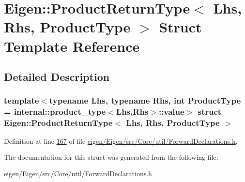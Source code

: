 \hypertarget{struct_eigen_1_1_product_return_type}{}\section{Eigen\+:\+:Product\+Return\+Type$<$ Lhs, Rhs, Product\+Type $>$ Struct Template Reference}
\label{struct_eigen_1_1_product_return_type}


\subsection{Detailed Description}
\subsubsection*{template$<$typename Lhs, typename Rhs, int Product\+Type = internal\+::product\+\_\+type$<$\+Lhs,\+Rhs$>$\+::value$>$\newline
struct Eigen\+::\+Product\+Return\+Type$<$ Lhs, Rhs, Product\+Type $>$}



Definition at line \hyperlink{eigen_2_eigen_2src_2_core_2util_2_forward_declarations_8h_source_l00167}{167} of file \hyperlink{eigen_2_eigen_2src_2_core_2util_2_forward_declarations_8h_source}{eigen/\+Eigen/src/\+Core/util/\+Forward\+Declarations.\+h}.



The documentation for this struct was generated from the following file\+:\begin{DoxyCompactItemize}
\item 
eigen/\+Eigen/src/\+Core/util/\+Forward\+Declarations.\+h\end{DoxyCompactItemize}
